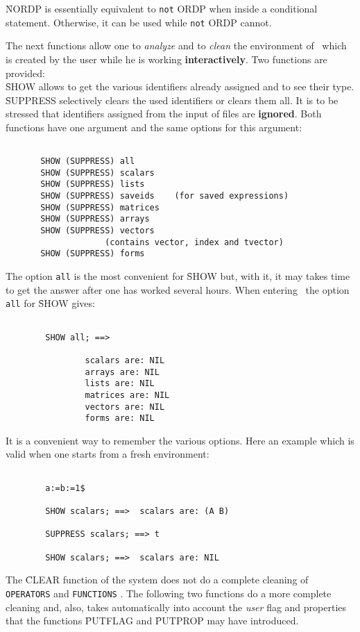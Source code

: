 \f{NORDP} is essentially equivalent to \verb+not+\f{ ORDP}
 when inside a conditional statement. Otherwise, it can be used
while \verb+not+\f{ ORDP} cannot.
\item[ii.]
The next functions allow one to {\em analyze} and to
{\em clean} the environment
of \REDUCE\  which is created by the user while he is working
{\bf interactively}. Two functions are provided:\\
\f{SHOW} allows to get the various identifiers already
assigned and to see their type. \f{SUPPRESS} selectively clears the
used identifiers or clears them all. It is to be stressed that identifiers
assigned from the input of files are {\bf ignored}.
Both functions have one argument and the same options for this
argument:
\begin{verbatim}

       SHOW (SUPPRESS) all
       SHOW (SUPPRESS) scalars
       SHOW (SUPPRESS) lists
       SHOW (SUPPRESS) saveids    (for saved expressions)
       SHOW (SUPPRESS) matrices
       SHOW (SUPPRESS) arrays
       SHOW (SUPPRESS) vectors
                    (contains vector, index and tvector)
       SHOW (SUPPRESS) forms

\end{verbatim}
The option \verb+all+ is the most convenient for \f{SHOW} but,
with it, it may
takes time to get the answer after one has worked several hours.
When entering \REDUCE\ the option \verb+all+ for \f{SHOW} gives:
\begin{verbatim}

        SHOW all; ==>

                scalars are: NIL
                arrays are: NIL
                lists are: NIL
                matrices are: NIL
                vectors are: NIL
                forms are: NIL

\end{verbatim}
It is a convenient way to remember the various options. Here an example
which is valid when one starts from a fresh environment:
\begin{verbatim}

        a:=b:=1$

        SHOW scalars; ==>  scalars are: (A B)

        SUPPRESS scalars; ==> t

        SHOW scalars; ==>  scalars are: NIL

\end{verbatim}
\item[iii.]
The \f{CLEAR} function of the system does not do a complete cleaning of
\verb+OPERATORS+ and \verb+FUNCTIONS+ . The following two functions do a more
complete cleaning and, also, takes automatically into account the
{\em user} flag and properties that the functions
\f{PUTFLAG} and \f{PUTPROP} may have introduced.


